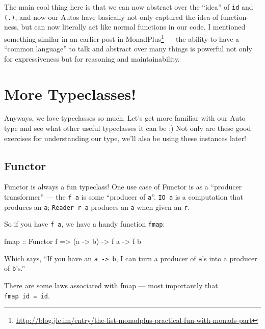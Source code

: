 \documentclass[]{article}
\newenvironment{Shaded}{}{}
\newcommand{\DataTypeTok}[1]{\textcolor[rgb]{0.56,0.13,0.00}{#1}}
\newcommand{\NormalTok}[1]{#1}
\newcommand{\OtherTok}[1]{\textcolor[rgb]{0.00,0.44,0.13}{#1}}
\renewcommand{\href}[2]{#2\footnote{\url{#1}}}
\begin{document}
The main cool thing here is that we can now abstract over the ``idea'' of
\texttt{id} and \texttt{(.)}, and now our Autos have basically not only captured
the idea of function-ness, but can now literally act like normal functions in
our code. I mentioned something similar in an earlier post
\href{http://blog.jle.im/entry/the-list-monadplus-practical-fun-with-monads-part}{in
MonadPlus} --- the ability to have a ``common language'' to talk and abstract
over many things is powerful not only for expressiveness but for reasoning and
maintainability.

\hypertarget{more-typeclasses}{%
\section{More Typeclasses!}\label{more-typeclasses}}

Anyways, we love typeclasses so much. Let's get more familiar with our Auto type
and see what other useful typeclasses it can be :) Not only are these good
exercises for understanding our type, we'll also be using these instances later!

\hypertarget{functor}{%
\subsection{Functor}\label{functor}}

Functor is always a fun typeclass! One use case of Functor is as a ``producer
transformer'' --- the \texttt{f\ a} is some ``producer of \texttt{a}''.
\texttt{IO\ a} is a computation that produces an \texttt{a};
\texttt{Reader\ r\ a} produces an \texttt{a} when given an \texttt{r}.

So if you have \texttt{f\ a}, we have a handy function \texttt{fmap}:

\begin{Shaded}
\begin{Highlighting}[]
\NormalTok{fmap}\OtherTok{ ::} \DataTypeTok{Functor}\NormalTok{ f }\OtherTok{=>}\NormalTok{ (a }\OtherTok{->}\NormalTok{ b) }\OtherTok{->}\NormalTok{ f a }\OtherTok{->}\NormalTok{ f b}
\end{Highlighting}
\end{Shaded}

Which says, ``If you have an \texttt{a\ -\textgreater{}\ b}, I can turn a
producer of \texttt{a}'s into a producer of \texttt{b}'s.''

There are some laws associated with fmap --- most importantly that
\texttt{fmap\ id\ =\ id}.
\end{document}
